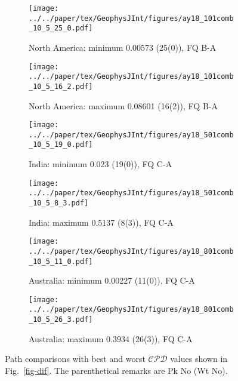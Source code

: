 \begin{figure}
  \centering
  \begin{subfigure}{.42\textwidth} %
    \texttt{[image: ../../paper/tex/GeophysJInt/figures/ay18\_101comb\_10\_5\_25\_0.pdf]}
    \caption{North America: minimum 0.00573 (25(0)), FQ
      B-A}\label{fig-nac-105250}
  \end{subfigure}
  \begin{subfigure}{.42\textwidth} %
    \texttt{[image: ../../paper/tex/GeophysJInt/figures/ay18\_101comb\_10\_5\_16\_2.pdf]}
    \caption{North America: maximum 0.08601 (16(2)), FQ
      B-A}\label{fig-nac-105162}
  \end{subfigure}
  \vspace{.1em}
  \begin{subfigure}{.42\textwidth}
    \texttt{[image: ../../paper/tex/GeophysJInt/figures/ay18\_501comb\_10\_5\_19\_0.pdf]}
    \caption{India: minimum 0.023 (19(0)), FQ C-A}\label{fig-ind-105190}
  \end{subfigure}
  \begin{subfigure}{.42\textwidth}
    \texttt{[image: ../../paper/tex/GeophysJInt/figures/ay18\_501comb\_10\_5\_8\_3.pdf]}
    \caption{India: maximum 0.5137 (8(3)), FQ C-A}\label{fig-ind-10583}
  \end{subfigure}
  \vspace{.1em}
  \begin{subfigure}{.42\textwidth}
    \texttt{[image: ../../paper/tex/GeophysJInt/figures/ay18\_801comb\_10\_5\_11\_0.pdf]}
    \caption{Australia: minimum 0.00227 (11(0)), FQ C-A}\label{fig-au-105110}
  \end{subfigure}
  \begin{subfigure}{.42\textwidth}
    \texttt{[image: ../../paper/tex/GeophysJInt/figures/ay18\_801comb\_10\_5\_26\_3.pdf]}
    \caption{Australia: maximum 0.3934 (26(3)), FQ C-A}\label{fig-au-105263}
  \end{subfigure}
  \caption[Best and worst $\mathcal{CPD}$s (10/5 Myr window/step)]{Path
    comparisons with best and worst $\mathcal{CPD}$ values shown in
    Fig.~\ref{fig-dif}. The parenthetical remarks are Pk No (Wt No).}\label{fig-difbw}
\end{figure}

